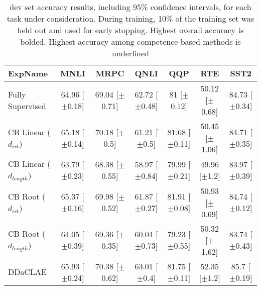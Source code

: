 \begin{table*}[ht]
\centering
\begingroup\small
\begin{tabular}{lcccccc}
  \toprule
ExpName & MNLI & MRPC & QNLI & QQP & RTE & SST2 \\ 
  \midrule
Fully Supervised & 64.96 [$\pm$0.18] & 69.04 [$\pm$0.71] & 62.72 [$\pm$0.48] & 81 [$\pm$0.12] & 50.12 [$\pm$0.68] & 84.73 [$\pm$0.34] \\ 
  CB Linear ($d_{irt}$) & 65.18 [$\pm$0.14] & 70.18 [$\pm$0.5] & 61.21 [$\pm$0.5] & 81.68 [$\pm$0.11] & 50.45 [$\pm$1.06] & 84.71 [$\pm$0.35] \\ 
  CB Linear ($d_{length}$) & 63.79 [$\pm$0.23] & 68.38 [$\pm$0.55] & 58.97 [$\pm$0.84] & 79.99 [$\pm$0.21] & 49.96 [$\pm$1.2] & 83.97 [$\pm$0.39] \\ 
  CB Root ($d_{irt}$) & 65.37 [$\pm$0.16] & 69.98 [$\pm$0.52] & 61.87 [$\pm$0.27] & 81.91 [$\pm$0.08] & 50.93 [$\pm$0.69] & 84.74 [$\pm$0.12] \\ 
  CB Root ($d_{length}$) & 64.05 [$\pm$0.39] & 69.36 [$\pm$0.35] & 60.04 [$\pm$0.73] & 79.23 [$\pm$0.55] & 50.32 [$\pm$1.62] & 83.74 [$\pm$0.43] \\ 
  DDaCLAE & 65.93 [$\pm$0.24] & 70.38 [$\pm$0.62] & 63.01 [$\pm$0.4] & 81.75 [$\pm$0.11] & 52.35 [$\pm$1.2] & 85.7 [$\pm$0.19] \\ 
   \bottomrule
\end{tabular}
\endgroup
\caption{dev set accuracy results, including 95\% confidence intervals, for each task under consideration. During training, 10\% of the training set was held out and used for early stopping. Highest overall accuracy is bolded. Highest accuracy among competence-based methods is underlined} 
\label{tab:acc_lstm-True}
\end{table*}
